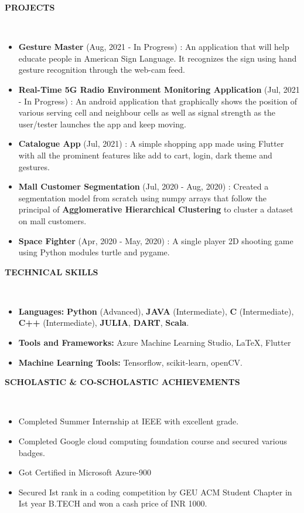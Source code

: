 \documentclass[a4paper,10pt]{article}
\newcommand{\lsep}{-0.5cm}
\newcommand{\resheading}[1]{{\small \colorbox{mygrey}{\begin{minipage}{0.975\textwidth}{\textbf{#1 \vphantom{p\^{E}}}}\end{minipage}}}}
\begin{document}
\resheading{\textbf{PROJECTS} }\\[\lsep]
\begin{itemize}
\setlength\itemsep{0.5em}
\item \textbf{Gesture Master} (Aug, 2021 - In Progress) : An application that will help educate people in American Sign Language. It recognizes the sign using hand gesture recognition through the web-cam feed.
\item \textbf{Real-Time 5G Radio Environment Monitoring Application} (Jul, 2021 - In Progress) : An android application that graphically shows the position of various serving cell and neighbour cells as well as signal strength as the user/tester launches the app and keep moving.
\item \textbf{Catalogue App} (Jul, 2021) : A simple shopping app made using Flutter with all the prominent features like add to cart, login, dark theme and gestures.
\item \textbf{Mall Customer Segmentation} (Jul, 2020 - Aug, 2020) : Created a segmentation model from scratch using numpy arrays that follow the principal of \textbf{Agglomerative Hierarchical Clustering} to cluster a dataset on mall customers.
\item \textbf{Space Fighter} (Apr, 2020 - May, 2020) : A single player 2D shooting game using Python modules turtle and pygame.
\end{itemize}

\resheading{\textbf{TECHNICAL SKILLS} }\\[\lsep]
\begin{itemize}
\setlength\itemsep{0em}
\item \noindent \textbf{Languages:} \textbf{Python} (Advanced), \textbf{JAVA} (Intermediate), \textbf{C} (Intermediate), \textbf{C++} (Intermediate), \textbf{JULIA}, \textbf{DART}, \textbf{Scala}.\\
\item \noindent\textbf{Tools and Frameworks:} Azure Machine Learning Studio, \LaTeX, Flutter\\
\item \noindent \textbf{Machine Learning Tools:} Tensorflow, scikit-learn, openCV.
\end{itemize}

\resheading{\textbf{SCHOLASTIC \& CO-SCHOLASTIC ACHIEVEMENTS} }\\[\lsep]
\begin{itemize}
\setlength\itemsep{0em}
\item \noindent Completed Summer Internship at IEEE with excellent grade.
\item \noindent Completed Google cloud computing foundation course and secured various badges.
\item \noindent Got Certified in Microsoft Azure-900
\item \noindent Secured Ist rank in a coding competition by GEU ACM Student Chapter in Ist year B.TECH and won a cash price of INR 1000.
\end{itemize}
\end{document}
